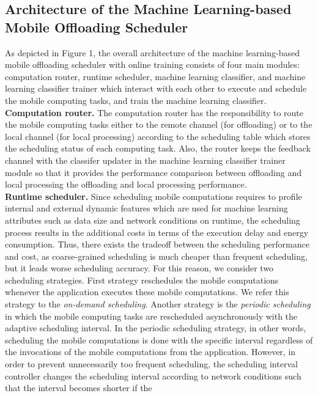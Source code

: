 \documentclass[10pt, conference, compsocconf]{IEEEtran}
\begin{document}
\subsection{Architecture of the Machine Learning-based Mobile Offloading
Scheduler}
%
As depicted in Figure 1, the overall architecture of the machine
learning-based mobile offloading scheduler with online training consists
of four main modules: computation router, runtime scheduler, machine
learning classifier, and machine learning classifier trainer which
interact with each other to execute and schedule the mobile computing
tasks, and train the machine learning classifier.\\
%
\textbf{Computation router.} The computation router has the
responsibility to route the mobile computing tasks either to the remote
channel (for offloading) or to the local channel (for local processing)
according to the scheduling table which stores the scheduling status of
each computing task.
%
Also, the router keeps the feedback channel with the classifer updater
in the machine learning classifier trainer module so that it provides
the performance comparison between offloading and local processing 
the offloading and local processing performance.\\
%
\textbf{Runtime scheduler.} Since scheduling mobile computations
requires to profile internal and external dynamic features which are
used for machine learning attributes such as data size and network
conditions on runtime, the scheduling process results in the additional
costs in terms of the execution delay and energy consumption.
%
Thus, there exists the tradeoff between the scheduling performance and
cost, as coarse-grained scheduling is much cheaper than frequent
scheduling, but it leads worse scheduling accuracy.    
%
For this reason, we consider two scheduling strategies.
%
First strategy reschedules the mobile computations whenever the
application executes these mobile computations.
%
We refer this strategy to the \textit{on-demand scheduling}.
%
Another strategy is the \textit{periodic scheduling} in which the mobile
computing tasks are rescheduled asynchronously with the adaptive
scheduling interval.
%
In the periodic scheduling strategy, in other words, scheduling the mobile
computations is done with the specific interval regardless of the
invocations of the mobile computations from the application.
%
However, in order to prevent unnecessarily too frequent scheduling, the
scheduling interval controller changes the scheduling interval according
to network conditions such that the interval becomes shorter if the
\end{document}
